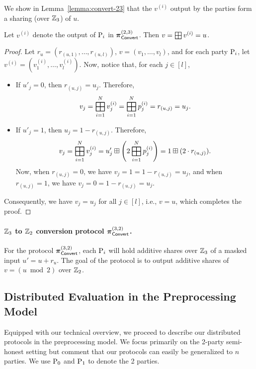 \noindent We show in Lemma~\ref{lemma:convert-23} that the $v^{(i)}$ output by the parties form a sharing (over $\mathbb{Z}_3$) of $u$.

\begin{lemma}
Let $v^{(i)}$ denote the output of $\textnormal{P}_i$ in $\boldsymbol{\pi}_{\textsf{Convert}}^{(2,3)}$. Then $v = \bigboxplus v^{(i)} = u$.
\label{lemma:convert-23}
\end{lemma}
\begin{proof}
Let $r_u = (r_{(u,1)}, \dots, r_{(u,l)})$, $v = (v_1, \dots, v_l)$, and for each party $\textnormal{P}_i$, let $v^{(i)} = (v^{(i)}_1, \dots, v^{(i)}_l)$. Now, notice that, for each $j \in [l]$,
\begin{itemize}
    \item If $u'_j = 0$, then $r_{(u,j)} = u_j$. Therefore,
    \[
     v_j = \bigboxplus_{i=1}^N v^{(i)}_j = \bigboxplus_{i=1}^N p^{(i)}_j = r_{(u,j)} = u_j.
    \]
    \item If $u'_j = 1$, then $u_j = 1 - r_{(u,j)}$. Therefore,
    \[
    v_j = \bigboxplus_{i=1}^N v^{(i)}_j = u'_j \boxplus \left(2\bigboxplus_{i=1}^N p^{(i)}_j \right) = 1 \boxplus (2 \cdot r_{(u,j)}).
    \]
    \noindent Now, when $r_{(u,j)} = 0$, we have $v_j = 1 = 1 - r_{(u,j)} = u_j$, and when $r_{(u,j)} = 1$, we have $v_j = 0 = 1 - r_{(u,j)} = u_j$.
\end{itemize}
Consequently, we have $v_j = u_j$ for all $j \in [l]$, i.e., $v = u$, which completes the proof.
\end{proof}

\paragraph{$\mathbb{Z}_3$ to $\mathbb{Z}_2$ conversion protocol $\boldsymbol{\pi}_{\textsf{Convert}}^{(3,2)}$.}
For the protocol $\boldsymbol{\pi}_{\textsf{Convert}}^{(3,2)}$, each $\textnormal{P}_i$ will hold additive shares over $\mathbb{Z}_3$ of a masked input $u' = u + r_u$. The goal of the protocol is to output additive shares of $v = (u \bmod 2)$ over $\mathbb{Z}_2$.


\subsection{Distributed Evaluation in the Preprocessing Model}
Equipped with our technical overview, we proceed to describe our distributed protocols in the preprocessing model. We focus primarily on the 2-party semi-honest setting but comment that our protocols can easily be generalized to $n$ parties. We use $\textnormal{P}_0$ and $\textnormal{P}_1$ to denote the 2 parties.


